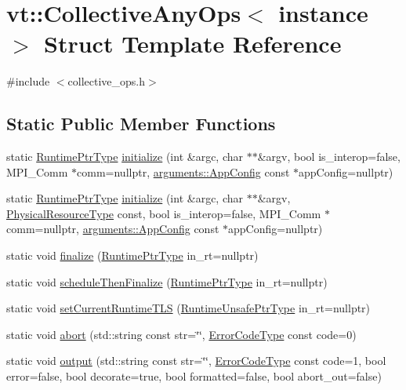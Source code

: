 \hypertarget{structvt_1_1_collective_any_ops}{}\section{vt\+:\+:Collective\+Any\+Ops$<$ instance $>$ Struct Template Reference}
\label{structvt_1_1_collective_any_ops}


{\ttfamily \#include $<$collective\+\_\+ops.\+h$>$}

\subsection*{Static Public Member Functions}
\begin{DoxyCompactItemize}
\item 
static \hyperlink{namespacevt_a0ce60e0299d8fa32223b3b9ffa0af466}{Runtime\+Ptr\+Type} \hyperlink{structvt_1_1_collective_any_ops_aadcc1fe5e20336eebcd28d5800700cc4}{initialize} (int \&argc, char $\ast$$\ast$\&argv, bool is\+\_\+interop=false, M\+P\+I\+\_\+\+Comm $\ast$comm=nullptr, \hyperlink{structvt_1_1arguments_1_1_app_config}{arguments\+::\+App\+Config} const $\ast$app\+Config=nullptr)
\item 
static \hyperlink{namespacevt_a0ce60e0299d8fa32223b3b9ffa0af466}{Runtime\+Ptr\+Type} \hyperlink{structvt_1_1_collective_any_ops_a8b33216bf58d945721ab8d74d255dac5}{initialize} (int \&argc, char $\ast$$\ast$\&argv, \hyperlink{namespacevt_a2dc36fcada816dc6d11774d650328ee9}{Physical\+Resource\+Type} const, bool is\+\_\+interop=false, M\+P\+I\+\_\+\+Comm $\ast$comm=nullptr, \hyperlink{structvt_1_1arguments_1_1_app_config}{arguments\+::\+App\+Config} const $\ast$app\+Config=nullptr)
\item 
static void \hyperlink{structvt_1_1_collective_any_ops_ae2260154e455458fc26f02f0bce6702d}{finalize} (\hyperlink{namespacevt_a0ce60e0299d8fa32223b3b9ffa0af466}{Runtime\+Ptr\+Type} in\+\_\+rt=nullptr)
\item 
static void \hyperlink{structvt_1_1_collective_any_ops_af1fb099b2441c194dd22f02da8ef46d9}{schedule\+Then\+Finalize} (\hyperlink{namespacevt_a0ce60e0299d8fa32223b3b9ffa0af466}{Runtime\+Ptr\+Type} in\+\_\+rt=nullptr)
\item 
static void \hyperlink{structvt_1_1_collective_any_ops_aa86dfdc9c8ac6f25033948b5dd26fb5b}{set\+Current\+Runtime\+T\+LS} (\hyperlink{namespacevt_a8019b70cc4b9b0833c38559c85dfd53b}{Runtime\+Unsafe\+Ptr\+Type} in\+\_\+rt=nullptr)
\item 
static void \hyperlink{structvt_1_1_collective_any_ops_a31a089ab739c612171e581ead8922e8b}{abort} (std\+::string const str=\char`\"{}\char`\"{}, \hyperlink{namespacevt_a793764d753923abc3d32929870beb485}{Error\+Code\+Type} const code=0)
\item 
static void \hyperlink{structvt_1_1_collective_any_ops_a5ae4676659166ab1e1ac7334776d58c3}{output} (std\+::string const str=\char`\"{}\char`\"{}, \hyperlink{namespacevt_a793764d753923abc3d32929870beb485}{Error\+Code\+Type} const code=1, bool error=false, bool decorate=true, bool formatted=false, bool abort\+\_\+out=false)
\end{DoxyCompactItemize}


